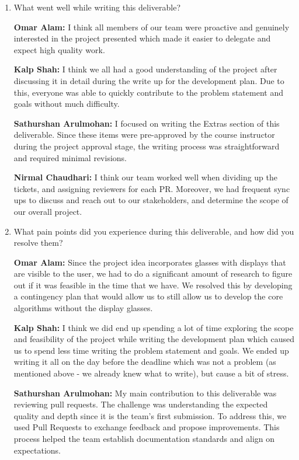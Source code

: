 \documentclass{article}
\begin{document}
\begin{enumerate}
    \item What went well while writing this deliverable? 
    
    \textbf{Omar Alam:} I think all members of our team were proactive and genuinely interested in the project presented which made it easier
    to delegate and expect high quality work. 
    
    \textbf{Kalp Shah:} I think we all had a good understanding of the project after discussing it in detail during
    the write up for the development plan. Due to this, everyone was able to quickly contribute to the problem statement
    and goals without much difficulty.

    \textbf{Sathurshan Arulmohan:} I focused on writing the Extras section of this deliverable.
    Since these items were pre-approved by the course instructor during the project approval stage, the writing process was straightforward and required minimal revisions.

    \textbf{Nirmal Chaudhari:} I think our team worked well when dividing up the tickets, and assigning reviewers for each PR. 
    Moreover, we had frequent sync ups to discuss and reach out to our stakeholders, and determine the scope of our overall project. 

    \item What pain points did you experience during this deliverable, and how
    did you resolve them?

    \textbf{Omar Alam:} Since the project idea incorporates glasses with displays that are visible to the user, we had to do a significant amount
    of research to figure out if it was feasible in the time that we have. We resolved this by developing a contingency plan that would allow us to 
    still allow us to develop the core algorithms without the display glasses.
    
    \textbf{Kalp Shah:} I think we did end up spending a lot of time exploring the scope and feasibility of the project while writing the development
    plan which caused us to spend less time writing the problem statement and goals. We ended up writing it all on the day before the deadline which
    was not a problem (as mentioned above - we already knew what to write), but cause a bit of stress.

    \textbf{Sathurshan Arulmohan:} My main contribution to this deliverable was reviewing pull requests.
    The challenge was understanding the expected quality and depth since it is the team's first submission.
    To address this, we used Pull Requests to exchange feedback and propose improvements.
    This process helped the team establish documentation standards and align on expectations.


\end{enumerate}
\end{document}

